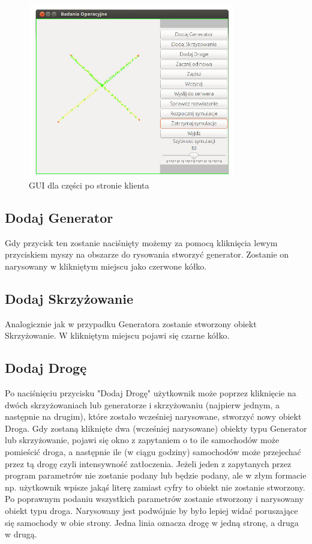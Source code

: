 \documentclass{article}
\begin{document}
\begin{figure}[ht!]
\centering
\includegraphics[width=90mm]{gui.jpg}
\caption{GUI dla części po stronie klienta}
\label{overflow}
\end{figure}

\subsection{Dodaj Generator}
    Gdy przycisk ten zostanie naciśnięty możemy za pomocą kliknięcia lewym przyciskiem myszy na obszarze do rysowania stworzyć generator. Zostanie on narysowany w klikniętym miejscu jako czerwone kółko.

\subsection{Dodaj Skrzyżowanie}
    Analogicznie jak w przypadku Generatora zostanie stworzony obiekt Skrzyżowanie. W klikniętym miejscu pojawi się czarne kółko.

\subsection{Dodaj Drogę}
    Po naciśnięciu przycisku "Dodaj Drogę" użytkownik może poprzez kliknięcie na dwóch skrzyżowaniach lub generatorze i skrzyżowaniu (najpierw jednym, a następnie na drugim), które zostało wcześniej narysowane, stworzyć nowy obiekt Droga. Gdy zostaną kliknięte dwa (wcześniej narysowane) obiekty typu Generator lub skrzyżowanie, pojawi się okno z zapytaniem o to ile samochodów może pomieścić droga, a następnie ile (w ciągu godziny) samochodów może przejechać przez tą drogę czyli intensywność zatłoczenia. Jeżeli jeden z zapytanych przez program parametrów nie zostanie podany lub będzie podany, ale w złym formacie np. użytkownik wpisze jakąś literę zamiast cyfry to obiekt nie zostanie stworzony. Po poprawnym podaniu wszystkich parametrów zostanie stworzony i narysowany obiekt typu droga. Narysowany jest podwójnie by było lepiej widać poruszające się samochody w obie strony. Jedna linia oznacza drogę w jedną stronę, a druga w drugą.
\end{document}
